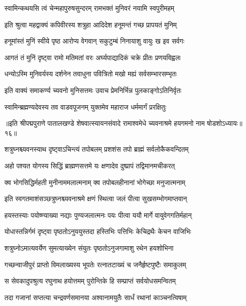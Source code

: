 \twolineshloka
{स्वामिन्कथयसि त्वं चेन्महापुरुषसुन्दरम्}
{रामभक्तं मुनिवरं नयामि स्वपुरीमहम्}%

\twolineshloka
{इति श्रुत्वा महद्वाक्यं कपिवीरस्य शत्रुहा}
{आदिदेश हनूमन्तं गच्छ प्रापयतं मुनिम्}%

\twolineshloka
{हनूमांस्तं मुनिं स्वीये पृष्ठ आरोप्य वेगवान्}
{सकुटुम्बं निनायाशु वायुः ख इव सर्वगः}%

\twolineshloka
{आगतं तं मुनिं दृष्ट्वा रामो मतिमतां वरः}
{अर्घ्यपाद्यादिकं चक्रे प्रीतः प्रणयविह्वलः}%

\twolineshloka
{धन्योऽस्मि मुनिवर्यस्य दर्शनेन तवाधुना}
{पवित्रितो मखो मह्यं सर्वसम्भारसम्भृतः}%

\twolineshloka
{इति वाक्यं समाकर्ण्य च्यवनो मुनिसत्तमः}
{उवाच प्रेमनिर्भिन्न पुलकाङ्गोऽतिनिर्वृतः}%

\twolineshloka
{स्वामिन्ब्रह्मण्यदेवस्य तव वाडवपूजनम्}
{युक्तमेव महाराज धर्ममार्गं प्ररक्षितुः}%

{॥इति श्रीपद्मपुराणे पातालखण्डे शेषवात्स्यायनसंवादे रामाश्वमेधे च्यवनाश्रमे हयगमनो नाम षोडशोऽध्यायः॥१६॥}



\twolineshloka
{शत्रुघ्नश्च्यवनस्याथ दृष्ट्वाऽचिन्त्यं तपोबलम्}
{प्रशशंस तपो ब्राह्मं सर्वलोकैकवन्दितम्}%

\twolineshloka
{अहो पश्यत योगस्य सिद्धिं ब्राह्मणसत्तमे}
{यः क्षणादेव दुष्प्रापं तद्विमानमचीकरत्}%

\twolineshloka
{क्व भोगसिद्धिर्महती मुनीनाममलात्मनाम्}
{क्व तपोबलहीनानां भोगेच्छा मनुजात्मनाम्}%

\twolineshloka
{इति स्वगतमाशंसञ्छत्रुघ्नश्च्यवनाश्रमे}
{क्षणं स्थित्वा जलं पीत्वा सुखसम्भोगमाप्तवान्}%

\twolineshloka
{हयस्तस्याः पयोष्ण्याख्या नद्याः पुण्यजलात्मनः}
{पयः पीत्वा ययौ मार्गे वायुवेगगतिर्महान्}%

\twolineshloka
{योधास्तन्निर्गमं दृष्ट्वा पृष्ठतोऽनुययुस्तदा}
{हस्तिभिः पत्तिभिः केचिद्रथैः केचन वाजिभिः}%

\twolineshloka
{शत्रुघ्नोऽमात्यवर्येण सुमत्याख्येन संयुतः}
{पृष्ठतोऽनुजगामाशु रथेन हयशोभिना}%

\twolineshloka
{गच्छन्वाजीपुरं प्राप्तो विमलाख्यस्य भूपतेः}
{रत्नातटाख्यं च जनैर्हृष्टपुष्टैः समाकुलम्}%

\twolineshloka
{स सेवकादुपश्रुत्य रघुनाथ हयोत्तमम्}
{पुरोन्तिके हि सम्प्राप्तं सर्वयोधसमन्वितम्}%

\twolineshloka
{तदा गजानां सप्तत्या चन्द्रवर्णसमानया}
{अश्वानामयुतैः सार्धं रथानां काञ्चनत्विषाम्}%

